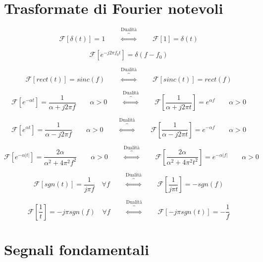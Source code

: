 \documentclass[10pt,a4paper]{article}
\begin{document}
\section{Trasformate di Fourier notevoli}

\[ 
\mathcal{F} [\delta(t)] = 1
\qquad \overbrace{\Leftrightarrow}^{\text{Dualità}} \qquad
\mathcal{F} [1] = \delta(t)
\]

\[ 
\mathcal{F} [e^{-j2\pi f_0t}] = \delta(f - f_0)
\]

\[ 
\mathcal{F} [rect(t)] = sinc(f) 
\qquad \overbrace{\Leftrightarrow}^{\text{Dualità}} \qquad
\mathcal{F} [sinc(t)] = rect(f)
\]

\[ 
\mathcal{F} [e^{-\alpha t}]  = \dfrac{1}{\alpha + j 2\pi f} \qquad \alpha > 0
\qquad \overbrace{\Leftrightarrow}^{\text{Dualità}} \qquad
\mathcal{F} \left[ \dfrac{1}{\alpha + j 2\pi t} \right] = e^{\alpha f} \qquad \alpha > 0
\]

\[ 
\mathcal{F} [e^{\alpha t}]  = \dfrac{1}{\alpha - j 2\pi f} \qquad \alpha > 0
\qquad \overbrace{\Leftrightarrow}^{\text{Dualità}} \qquad
\mathcal{F} \left[ \dfrac{1}{\alpha - j 2\pi t} \right] = e^{-\alpha f} \qquad \alpha > 0
\]


\[ 
\mathcal{F} [e^{-\alpha |t|}]  = \dfrac{2\alpha}{\alpha^2 + 4\pi^2 f^2} \qquad \alpha > 0
\qquad \overbrace{\Leftrightarrow}^{\text{Dualità}} \qquad
\mathcal{F} \left[ \dfrac{2\alpha}{\alpha^2 + 4\pi^2 t^2} \right] = e^{-\alpha |f|} \qquad \alpha > 0
\]

\[ 
\mathcal{F} [sgn(t)]  = \dfrac{1}{j\pi f} \quad \forall f
\qquad \overbrace{\Leftrightarrow}^{\text{Dualità}} \qquad
\mathcal{F} \left[ \dfrac{1}{j\pi t} \right] = -sgn(f)
\]

\[ 
\mathcal{F} \left[ \dfrac{1}{t}  \right]  = -j\pi sgn(f) \quad \forall f
\qquad \overbrace{\Leftrightarrow}^{\text{Dualità}} \qquad
\mathcal{F} \left[ -j\pi sgn(t) \right] = -\dfrac{1}{f}
\]

\section{Segnali fondamentali}
\end{document}

